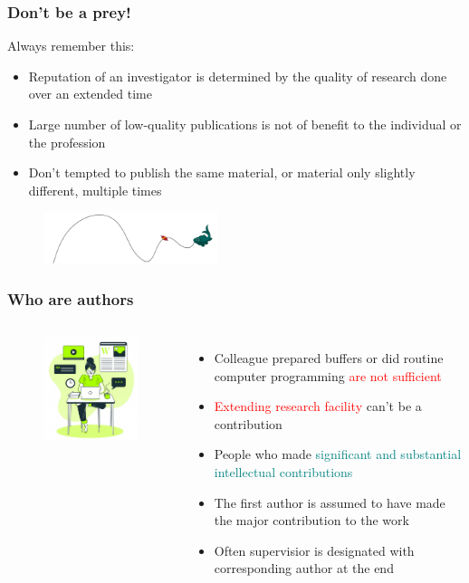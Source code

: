 \documentclass[newPxFont,sthlmFooter]{beamer}
\newcommand{\fs}{\footnotesize}
\begin{document}
\begin{frame}\frametitle{Don't be a prey!}
\begin{block}{\small Always remember this:}
\footnotesize
\begin{itemize}
\item Reputation of an investigator is determined by the quality of research done over an extended time
\item Large number of low-quality publications is not of benefit to the individual or the profession
\item Don't tempted to publish the same material, or material only slightly different, multiple times
\end{itemize}
\end{block}
\begin{figure}
    \centering
    \includegraphics[width=2in]{figs/prey} 
  \end{figure}
\end{frame}

\begin{frame}\frametitle{Who are authors}
  \begin{columns}[T,onlytextwidth]
  \begin{figure}
    \centering
    \includegraphics[width=2in]{figs/auth} 
  \end{figure}
  \begin{itemize}
  \fs
    \item Colleague prepared buffers or did routine computer programming \textcolor{red}{are not sufficient}
    \item \textcolor{red}{Extending research facility} can't be a contribution
    \item People who made \textcolor{teal}{significant and substantial intellectual contributions}
    \item The first author is assumed to have made the major contribution to the work
    \item Often supervisior is designated with corresponding author at the end
  \end{itemize}
  \vspace{-2cm}
  \end{columns}
\end{frame}
\end{document}
